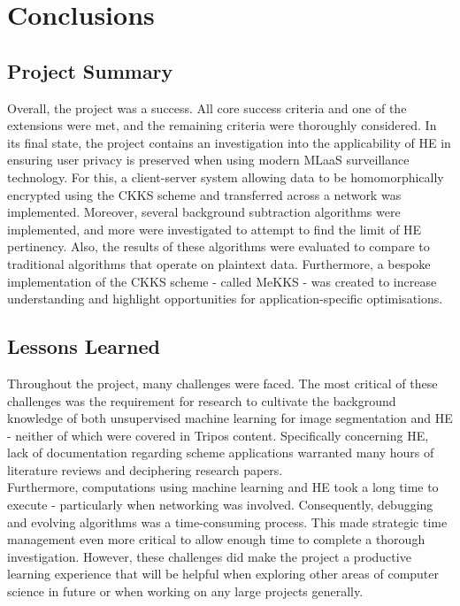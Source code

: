 \chapter{Conclusions}
\label{chap:conclusions}

\section{Project Summary}
\setlength{\leftskip}{0.25cm}
\indent \indent
Overall, the project was a success. All core success criteria and one of the extensions were met, and the remaining criteria were thoroughly considered. In its final state, the project contains an investigation into the applicability of HE in ensuring user privacy is preserved when using modern MLaaS surveillance technology. For this, a client-server system allowing data to be homomorphically encrypted using the CKKS scheme and transferred across a network was implemented. Moreover, several background subtraction algorithms were implemented, and more were investigated to attempt to find the limit of HE pertinency. Also, the results of these algorithms were evaluated to compare to traditional algorithms that operate on plaintext data. Furthermore, a bespoke implementation of the CKKS scheme - called MeKKS - was created to increase understanding and highlight opportunities for application-specific optimisations.

\setlength{\leftskip}{0cm}





\section{Lessons Learned}
\setlength{\leftskip}{0.25cm}
\indent \indent
Throughout the project, many challenges were faced. The most critical of these challenges was the requirement for research to cultivate the background knowledge of both unsupervised machine learning for image segmentation and HE - neither of which were covered in Tripos content. Specifically concerning HE, lack of documentation regarding scheme applications warranted many hours of literature reviews and deciphering research papers. 
\smallskip \\ \indent
Furthermore, computations using machine learning and HE took a long time to execute - particularly when networking was involved. Consequently, debugging and evolving algorithms was a time-consuming process. This made strategic time management even more critical to allow enough time to complete a thorough investigation. However, these challenges did make the project a productive learning experience that will be helpful when exploring other areas of computer science in future or when working on any large projects generally.

